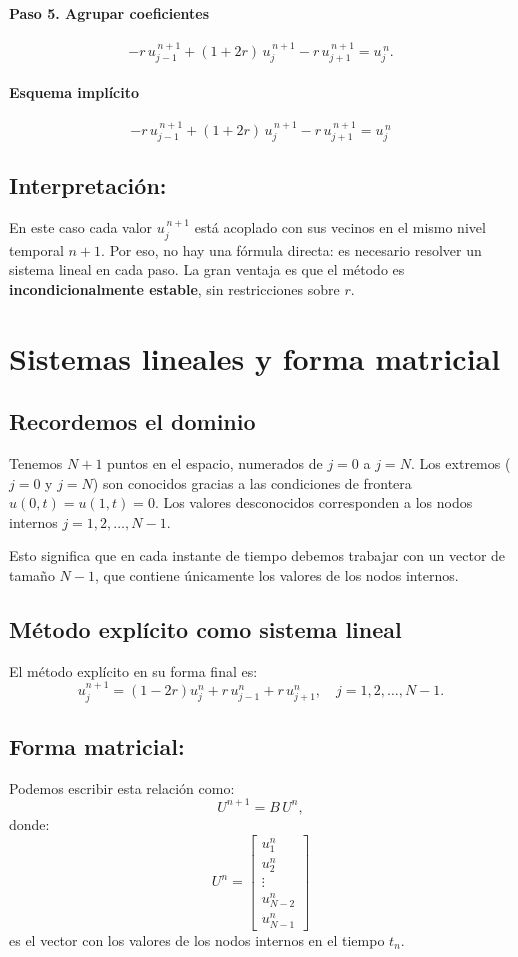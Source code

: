 \documentclass[12pt,a4paper]{article}
\begin{document}
\paragraph{Paso 5. Agrupar coeficientes}  
\[
-r\,u_{j-1}^{\,n+1} + (1+2r)\,u_j^{\,n+1} - r\,u_{j+1}^{\,n+1} = u_j^{\,n}.
\]

\paragraph{Esquema implícito}  
\[
\boxed{-r\,u_{j-1}^{\,n+1} + (1+2r)\,u_j^{\,n+1} - r\,u_{j+1}^{\,n+1} = u_j^{\,n}}
\]

\subsection*{Interpretación:} 
En este caso cada valor $u_j^{\,n+1}$ está acoplado con sus vecinos en el mismo nivel temporal $n+1$.  
Por eso, no hay una fórmula directa: es necesario resolver un sistema lineal en cada paso.  
La gran ventaja es que el método es \textbf{incondicionalmente estable}, sin restricciones sobre $r$.

\section{Sistemas lineales y forma matricial}

\subsection{Recordemos el dominio}

Tenemos \(N+1\) puntos en el espacio, numerados de \(j=0\) a \(j=N\).  
Los extremos (\(j=0\) y \(j=N\)) son conocidos gracias a las condiciones de frontera \(u(0,t)=u(1,t)=0\). Los valores desconocidos corresponden a los nodos internos \(j=1,2,\dots,N-1\).  

Esto significa que en cada instante de tiempo debemos trabajar con un vector de tamaño \(N-1\), que contiene únicamente los valores de los nodos internos.

\subsection{Método explícito como sistema lineal}

El método explícito en su forma final es:
\[
u_j^{n+1} = (1-2r)u_j^n + r\,u_{j-1}^n + r\,u_{j+1}^n, 
\quad j = 1, 2, \dots, N-1.
\]

\subsection*{Forma matricial:}
Podemos escribir esta relación como:
\[
U^{n+1} = B\,U^n,
\]
donde:
\[
U^n = 
\begin{bmatrix}
u_1^n \\[4pt] u_2^n \\[4pt] \vdots \\[4pt] u_{N-2}^n \\[4pt] u_{N-1}^n
\end{bmatrix}
\]
es el vector con los valores de los nodos internos en el tiempo \(t_n\). \\
\end{document}
